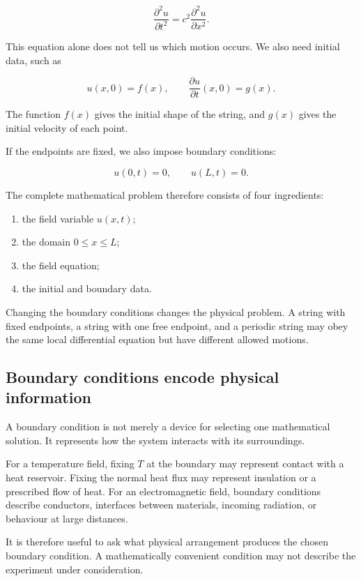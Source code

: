 \[
\frac{\partial^{2}u}{\partial t^{2}}
=
c^{2}\frac{\partial^{2}u}{\partial x^{2}}.
\]

This equation alone does not tell us which motion occurs. We also need initial data, such as

\[
u(x,0)=f(x),
\qquad
\frac{\partial u}{\partial t}(x,0)=g(x).
\]

The function \(f(x)\) gives the initial shape of the string, and \(g(x)\) gives the initial velocity of each point.

If the endpoints are fixed, we also impose boundary conditions:

\[
u(0,t)=0,
\qquad
u(L,t)=0.
\]

The complete mathematical problem therefore consists of four ingredients:

\begin{enumerate}
    \item the field variable \(u(x,t)\);
    \item the domain \(0\leq x\leq L\);
    \item the field equation;
    \item the initial and boundary data.
\end{enumerate}

Changing the boundary conditions changes the physical problem. A string with fixed endpoints, a string with one free endpoint, and a periodic string may obey the same local differential equation but have different allowed motions.

\subsection{Boundary conditions encode physical information}

A boundary condition is not merely a device for selecting one mathematical solution. It represents how the system interacts with its surroundings.

For a temperature field, fixing \(T\) at the boundary may represent contact with a heat reservoir. Fixing the normal heat flux may represent insulation or a prescribed flow of heat. For an electromagnetic field, boundary conditions describe conductors, interfaces between materials, incoming radiation, or behaviour at large distances.

It is therefore useful to ask what physical arrangement produces the chosen boundary condition. A mathematically convenient condition may not describe the experiment under consideration.

